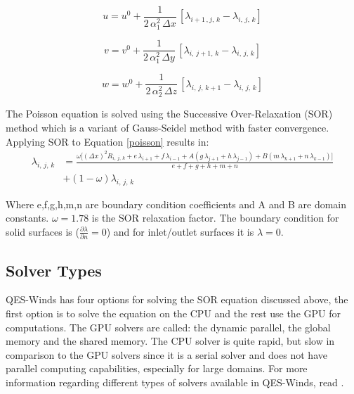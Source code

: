  \begin{equation} \label{eu-lag1}
 u = u^0 + \frac{1}{2\,\alpha_1^2\,\Delta x}\,[\lambda_{i+1\,,j,\,k}-\lambda_{i,\,j,\,k}]
\end{equation}

\begin{equation}
\label{eu-lag2}
 v = v^0 + \frac{1}{2\,\alpha_1^2\,\Delta y}\,[\lambda_{i,\,j+1,\,k}-\lambda_{i,\,j,\,k}]
\end{equation}

\begin{equation}
\label{eu-lag3}
 w = w^0 + \frac{1}{2\,\alpha_2^2\,\Delta z}\,[\lambda_{i,\,j,\,k+1}-\lambda_{i,\,j,\,k}]
\end{equation}

The Poisson equation is solved using the Successive Over-Relaxation (SOR) method which is a variant of Gauss-Seidel method with faster convergence. Applying SOR to Equation \ref{poisson} results in:
\begin{equation}
\label{SOR}
\begin{split}
 \lambda_{i,\,j,\,k} & = \frac{\omega\Bigg[(\Delta x)^2 R_{i,\,j,\,k}+e\,\lambda_{i+1}+f\, \lambda_{i-1}+A(g\,\lambda_{j+1}+h\, \lambda_{j-1}) + B(m\,\lambda_{k+1}+n\, \lambda_{k-1})\Bigg]}{e+f+g+h+m+n}\\
 & +(1-\omega)\lambda_{i,\,j,\,k}
 \end{split}
\end{equation}

Where e,f,g,h,m,n are boundary condition coefficients and A and B are domain constants. $\omega = 1.78$ is the SOR relaxation factor. The boundary condition for solid surfaces is ($\frac{\partial \lambda}{\partial n}=0$) and for inlet/outlet surfaces it is $\lambda=0$.


\subsection{Solver Types}

QES-Winds has four options for solving the SOR equation discussed above, the first option is to solve the equation on the CPU and the rest use the GPU for computations. The GPU solvers are called: the dynamic parallel, the global memory and the shared memory. The CPU solver is quite rapid, but slow in comparison to the GPU solvers since it is a serial solver and does not have parallel computing capabilities, especially for large domains. For more information regarding different types of solvers available in QES-Winds, read \cite{Bozorgmehr2021}.
